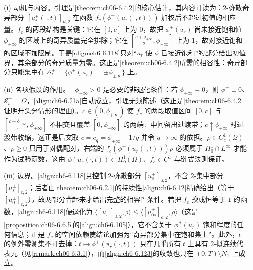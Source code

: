 \documentclass[../../main.tex]{subfiles}%
\begin{document}
\begin{remark}\label{remark:ch06-6.6.7}
(i) 动机与内容。引理是\cref{theorem:ch06-6.4.2}的核心估计，其内容可读为：$2$-弥散奇异部分 $[u^\pm_s(\cdot,t)]_{d,2}$ 在函数 $f_c(\phi^\pm(u_r(\cdot,t)))$ 加权后不超过初值的相应量。$f_c$ 的两段结构是关键：它在 $[0,c]$ 上为 $0$，故把 $\phi^+(u_r)$ 尚未接近饱和值 $\phi_{+\infty}$ 的区域上的奇异质量完全排除；它在 $[\frac{c+\phi_{+\infty}}{2},\phi_{+\infty}]$ 上为 $1$，故对接近饱和的区域不加限制。于是\eqref{align:ch6-6.118}只对“$u_r$ 使 $\phi$ 已接近饱和”的部分给出初值界，其余部分的奇异质量为零。这正是\cref{theorem:ch06-6.4.2}所需的相容性：奇异部分只能集中在 $\mathscr{S}^\pm_t=\{\phi^\pm(u_r)=\pm\phi_{\pm\infty}\}$ 上。

(ii) 各项假设的作用。$\pm\phi_{\pm\infty}>0$ 是必要的非退化条件：若 $\phi_{+\infty}=0$，则 $\phi^+\equiv0$、$\mathscr{S}^+_t=\Omega$，\eqref{align:ch6-6.21a}自动成立，引理无须陈述（这正是\cref{theorem:ch06-6.4.2}证明开头分情形的理由）。$c\in(0,\phi_{+\infty})$ 使 $f_c$ 的两段取值区间 $[0,c]$ 与 $[\frac{c+\phi_{+\infty}}{2},\phi_{+\infty}]$ 不相交且覆盖 $[0,\phi_{+\infty}]$ 的两端，中间留出过渡带；$c\uparrow\phi_{+\infty}$ 时过渡带收缩，这正是后文取 $c=c_q=\phi_{+\infty}-1/q$ 并令 $q\to\infty$ 的依据。$\rho\in C^1_c(\Omega)$、$\rho\geqslant0$ 只用于对偶配对，右端的 $f_c(\phi^+(u_r(\cdot,t)))\rho$ 必须属于 $H^1_0\cap L^\infty$ 才能作为试验函数，这由 $\phi(u_r(\cdot,t))\in H^1_0(\Omega)$、$f_c\in C^1$ 与链式法则保证。

(iii) 边界。\eqref{align:ch6-6.118}只控制 $2$-弥散部分 $[u^\pm_s]_{d,2}$，不含 $2$-集中部分 $[u^\pm_s]_{c,2}$；后者由\cref{theorem:ch06-6.2.1}的持续性\eqref{align:ch6-6.12}精确给出（等于 $[u^\pm_0]_{c,2}$），故两部分合起来才给出完整的相容性条件。若把 $f_c$ 换成恒等于 $1$ 的函数，\eqref{align:ch6-6.118}便退化为 $\langle[u^+_s]_{d,2},\rho\rangle\leqslant\langle[u^+_{0s}]_{d,2},\rho\rangle$（这是\cref{proposition:ch06-6.6.5}的\eqref{align:ch6-6.105}），它不含关于 $\phi^+(u_r)$ 饱和程度的任何信息；正是 $f_c$ 的空间依赖使结论加强为“奇异部分集中在饱和集上”。此外，$t$ 的例外零测集不可去掉：$t\mapsto\phi^+(u_r(\cdot,t))$ 只在几乎所有 $t$ 上具有 $2$-拟连续代表元（见\cref{remark:ch06-6.3.1}），而\eqref{align:ch6-6.123}的收敛也只在 $(0,T)\setminus N_1$ 上成立。
\end{remark}
\end{document}
